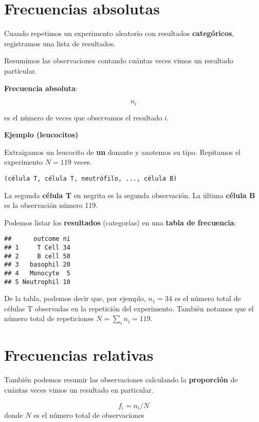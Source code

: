 \documentclass[
]{book}
\begin{document}
\hypertarget{frecuencias-absolutas}{%
\section{Frecuencias absolutas}\label{frecuencias-absolutas}}

Cuando repetimos un experimento aleatorio con resultados \textbf{categóricos}, registramos una lista de resultados.

Resumimos las observaciones contando cuántas veces vimos un resultado particular.

\textbf{Frecuencia absoluta}:

\[n_i\]

es el número de veces que observamos el resultado \(i\).

\textbf{Ejemplo (leucocitos)}

Extraigamos un leucocito de \textbf{un} donante y anotemos su tipo. Repitamos el experimento \(N=119\) veces.

\begin{verbatim}
(célula T, célula T, neutrófilo, ..., célula B)
\end{verbatim}

La segunda \textbf{célula T} en negrita es la segunda observación. La última \textbf{célula B} es la observación número 119.

Podemos listar los \textbf{resultados} (categorías) en una \textbf{tabla de frecuencia}:

\begin{verbatim}
##      outcome ni
## 1     T Cell 34
## 2     B cell 50
## 3   basophil 20
## 4   Monocyte  5
## 5 Neutrophil 10
\end{verbatim}

De la tabla, podemos decir que, por ejemplo, \(n_1=34\) es el número total de células T observadas en la repetición del experimento. También notamos que el número total de repeticiones \(N=\sum_i n_i=119\).

\hypertarget{frecuencias-relativas}{%
\section{Frecuencias relativas}\label{frecuencias-relativas}}

También podemos resumir las observaciones calculando la \textbf{proporción} de cuántas veces vimos un resultado en particular.

\[f_i=n_i/N\] donde \(N\) es el número total de observaciones
\end{document}
